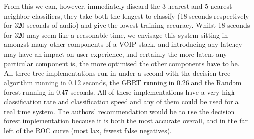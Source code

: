 \documentclass[ %
                    author={Sam Phippen},
                supervisor={Dr. Rafal Bogacz},
                     title={Real time voice activity detectors in noisy personal computing environments},
                  subtitle={},
                    degree={MEng},
                      year={2012} ]{thesis}
\begin{document}
From this we can, however, immediately discard the 3 nearest and 5 nearest
neighbor classifiers, they take both the longest to classify (18 seconds
respectively for 320 seconds of audio) and give the lowest training accuracy.
Whilst 18 seconds for 320 may seem like a reasonable time, we envisage this
system sitting in amongst many other components of a VOIP stack, and
introducing any latency may have an impact on user experience, and certainly
the more latent any particular component is, the more optimised the other
components have to be. All three tree implementations run in under a second
with the decision tree algorithm running in 0.12 seconds, the GBRT running in
0.26 and the Random forest running in 0.47 seconds. All of these
implementations have a very high classification rate and classification speed
and any of them could be used for a real time system. The authors'
recommendation would be to use the decision forest implementation because it is
both the most accurate overall, and in the far left of the ROC curve (most lax,
fewest false negatives).

%
%

\end{document}
